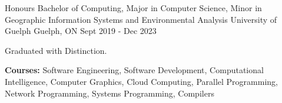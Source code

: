 \begin{cventries}
\cventry
{Honours Bachelor of Computing, Major in Computer Science, Minor in Geographic Information Systems and Environmental Analysis}
{University of Guelph}
{Guelph, ON}
{Sept 2019 - Dec 2023}
{
\begin{cvitems}
\item {Graduated with Distinction.}
\item {\textbf{Courses:} Software Engineering, Software Development, Computational Intelligence, Computer Graphics, Cloud Computing, Parallel Programming, Network Programming, Systems Programming, Compilers}
\end{cvitems}
}
\end{cventries}